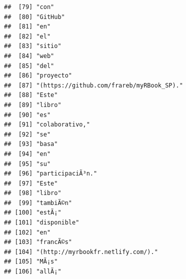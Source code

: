\documentclass[
]{book}
\begin{document}
\begin{verbatim}
##  [79] "con"                                                                              
##  [80] "GitHub"                                                                           
##  [81] "en"                                                                               
##  [82] "el"                                                                               
##  [83] "sitio"                                                                            
##  [84] "web"                                                                              
##  [85] "del"                                                                              
##  [86] "proyecto"                                                                         
##  [87] "(https://github.com/frareb/myRBook_SP)."                                          
##  [88] "Este"                                                                             
##  [89] "libro"                                                                            
##  [90] "es"                                                                               
##  [91] "colaborativo,"                                                                    
##  [92] "se"                                                                               
##  [93] "basa"                                                                             
##  [94] "en"                                                                               
##  [95] "su"                                                                               
##  [96] "participaciÃ³n."                                                                  
##  [97] "Este"                                                                             
##  [98] "libro"                                                                            
##  [99] "tambiÃ©n"                                                                         
## [100] "estÃ¡"                                                                            
## [101] "disponible"                                                                       
## [102] "en"                                                                               
## [103] "francÃ©s"                                                                         
## [104] "(http://myrbookfr.netlify.com/)."                                                 
## [105] "MÃ¡s"                                                                             
## [106] "allÃ¡"                                                                            

\end{verbatim}
\end{document}
